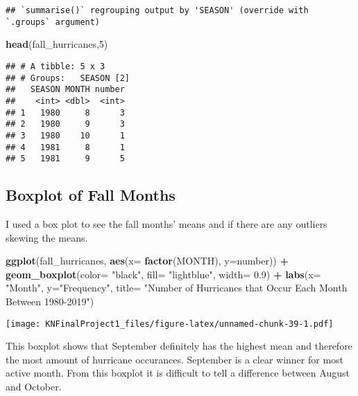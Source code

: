 \documentclass[
]{article}
\newenvironment{Shaded}{\begin{snugshade}}{\end{snugshade}}
\newcommand{\DataTypeTok}[1]{\textcolor[rgb]{0.13,0.29,0.53}{#1}}
\newcommand{\DecValTok}[1]{\textcolor[rgb]{0.00,0.00,0.81}{#1}}
\newcommand{\FloatTok}[1]{\textcolor[rgb]{0.00,0.00,0.81}{#1}}
\newcommand{\KeywordTok}[1]{\textcolor[rgb]{0.13,0.29,0.53}{\textbf{#1}}}
\newcommand{\NormalTok}[1]{#1}
\newcommand{\OperatorTok}[1]{\textcolor[rgb]{0.81,0.36,0.00}{\textbf{#1}}}
\newcommand{\StringTok}[1]{\textcolor[rgb]{0.31,0.60,0.02}{#1}}
\begin{document}
\begin{verbatim}
## `summarise()` regrouping output by 'SEASON' (override with `.groups` argument)
\end{verbatim}

\begin{Shaded}
\begin{Highlighting}[]
\KeywordTok{head}\NormalTok{(fall_hurricanes,}\DecValTok{5}\NormalTok{)}
\end{Highlighting}
\end{Shaded}

\begin{verbatim}
## # A tibble: 5 x 3
## # Groups:   SEASON [2]
##   SEASON MONTH number
##    <int> <dbl>  <int>
## 1   1980     8      3
## 2   1980     9      3
## 3   1980    10      1
## 4   1981     8      1
## 5   1981     9      5
\end{verbatim}

\hypertarget{boxplot-of-fall-months}{%
\subsection{Boxplot of Fall Months}\label{boxplot-of-fall-months}}

I used a box plot to see the fall months' means and if there are any
outliers skewing the means.

\begin{Shaded}
\begin{Highlighting}[]
\KeywordTok{ggplot}\NormalTok{(fall_hurricanes, }\KeywordTok{aes}\NormalTok{(}\DataTypeTok{x=} \KeywordTok{factor}\NormalTok{(MONTH), }\DataTypeTok{y=}\NormalTok{number)) }\OperatorTok{+}
\StringTok{  }\KeywordTok{geom_boxplot}\NormalTok{(}\DataTypeTok{color=} \StringTok{"black"}\NormalTok{, }\DataTypeTok{fill=} \StringTok{"lightblue"}\NormalTok{, }\DataTypeTok{width=} \FloatTok{0.9}\NormalTok{) }\OperatorTok{+}\StringTok{ }\KeywordTok{labs}\NormalTok{(}\DataTypeTok{x=} \StringTok{"Month"}\NormalTok{, }\DataTypeTok{y=}\StringTok{"Frequency"}\NormalTok{, }\DataTypeTok{title=} \StringTok{"Number of Hurricanes that Occur Each Month Between 1980-2019"}\NormalTok{)}
\end{Highlighting}
\end{Shaded}

\texttt{[image: KNFinalProject1\_files/figure-latex/unnamed-chunk-39-1.pdf]}

This boxplot shows that September definitely has the highest mean and
therefore the most amount of hurricane occurances. September is a clear
winner for most active month. From this boxplot it is difficult to tell
a difference between August and October.
\end{document}
